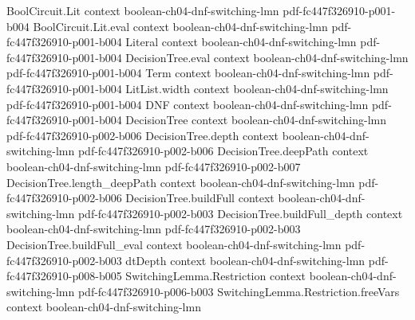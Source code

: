 \begin{theorem}
\label{LMN.switching_bernoulli_union_bound}
\leanok
{}
\proofstep
  {BoolCircuit.Lit}
  {context}
  {boolean-ch04-dnf-switching-lmn}
  {pdf-fc447f326910-p001-b004}
\proofstep
  {BoolCircuit.Lit.eval}
  {context}
  {boolean-ch04-dnf-switching-lmn}
  {pdf-fc447f326910-p001-b004}
\proofstep
  {Literal}
  {context}
  {boolean-ch04-dnf-switching-lmn}
  {pdf-fc447f326910-p001-b004}
\proofstep
  {DecisionTree.eval}
  {context}
  {boolean-ch04-dnf-switching-lmn}
  {pdf-fc447f326910-p001-b004}
\proofstep
  {Term}
  {context}
  {boolean-ch04-dnf-switching-lmn}
  {pdf-fc447f326910-p001-b004}
\proofstep
  {LitList.width}
  {context}
  {boolean-ch04-dnf-switching-lmn}
  {pdf-fc447f326910-p001-b004}
\proofstep
  {DNF}
  {context}
  {boolean-ch04-dnf-switching-lmn}
  {pdf-fc447f326910-p001-b004}
\proofstep
  {DecisionTree}
  {context}
  {boolean-ch04-dnf-switching-lmn}
  {pdf-fc447f326910-p002-b006}
\proofstep
  {DecisionTree.depth}
  {context}
  {boolean-ch04-dnf-switching-lmn}
  {pdf-fc447f326910-p002-b006}
\proofstep
  {DecisionTree.deepPath}
  {context}
  {boolean-ch04-dnf-switching-lmn}
  {pdf-fc447f326910-p002-b007}
\proofstep
  {DecisionTree.length_deepPath}
  {context}
  {boolean-ch04-dnf-switching-lmn}
  {pdf-fc447f326910-p002-b006}
\proofstep
  {DecisionTree.buildFull}
  {context}
  {boolean-ch04-dnf-switching-lmn}
  {pdf-fc447f326910-p002-b003}
\proofstep
  {DecisionTree.buildFull_depth}
  {context}
  {boolean-ch04-dnf-switching-lmn}
  {pdf-fc447f326910-p002-b003}
\proofstep
  {DecisionTree.buildFull_eval}
  {context}
  {boolean-ch04-dnf-switching-lmn}
  {pdf-fc447f326910-p002-b003}
\proofstep
  {dtDepth}
  {context}
  {boolean-ch04-dnf-switching-lmn}
  {pdf-fc447f326910-p008-b005}
\proofstep
  {SwitchingLemma.Restriction}
  {context}
  {boolean-ch04-dnf-switching-lmn}
  {pdf-fc447f326910-p006-b003}
\proofstep
  {SwitchingLemma.Restriction.freeVars}
  {context}
  {boolean-ch04-dnf-switching-lmn}

\end{theorem}
